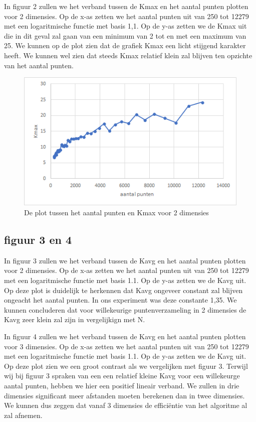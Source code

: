 \documentclass[12pt]{article}
\begin{document}
In figuur 2 zullen we het verband tussen de Kmax en het aantal punten plotten voor 2 dimensies.
Op de x-as zetten we het aantal punten uit van 250 tot 12279 met een logaritmische functie met basis 1,1.
Op de y-as zetten we de Kmax uit die in dit geval zal gaan van een minimum van 2 tot en met een maximum van 25.
We kunnen op de plot zien dat de grafiek Kmax een licht stijgend karakter heeft.
We kunnen wel zien dat steeds Kmax relatief klein zal blijven ten opzichte van het aantal punten.

\begin{figure}
\includegraphics[width=\textwidth]{punten-Kmax.png}
\caption{De plot tussen het aantal punten en Kmax voor 2 dimensies}
\end{figure}

\subsection{figuur 3 en 4}

In figuur 3 zullen we het verband tussen de Kavg en het aantal punten plotten voor 2 dimensies.
Op de x-as zetten we het aantal punten uit van 250 tot 12279 met een logaritmische functie met basis 1.1.
Op de y-as zetten we de Kavg uit.
Op deze plot is duidelijk te herkennen dat Kavg ongeveer constant zal blijven ongeacht het aantal punten.
In ons experiment was deze constante 1,35.
We kunnen concluderen dat voor willekeurige puntenverzameling in 2 dimensies de Kavg zeer klein zal zijn in vergelijkign met N.

In figuur 4 zullen we het verband tussen de Kavg en het aantal punten plotten voor 3 dimensies.
Op de x-as zetten we het aantal punten uit van 250 tot 12279 met een logaritmische functie met basis 1.1.
Op de y-as zetten we de Kavg uit.
Op deze plot zien we een groot contrast als we vergelijken met figuur 3.
Terwijl wij bij figuur 3 spraken van een een relatief kleine Kavg voor een willekeurge aantal punten, hebben we hier een positief lineair verband.
We zullen in drie dimensies significant meer afstanden moeten berekenen dan in twee dimensies.
We kunnen dus zeggen dat vanaf 3 dimensies de efficiëntie van het algoritme al zal afnemen.
\end{document}
